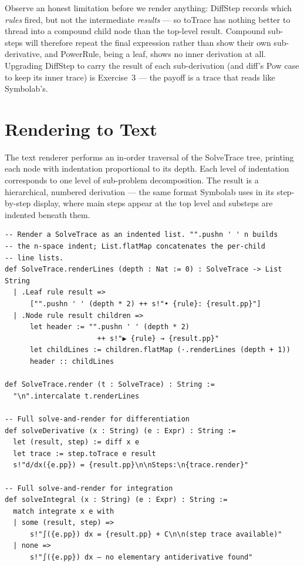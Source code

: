 \documentclass[12pt, openany]{book}
\theoremstyle{plain}
\theoremstyle{definition}
\theoremstyle{remark}
\newcommand{\li}[1]{{\ttfamily\small\color{tealaccent}#1}}
\begin{document}
Observe an honest limitation before we render anything: \li{DiffStep} records which \emph{rules} fired, but not the intermediate \emph{results} --- so \li{toTrace} has nothing better to thread into a compound child node than the top-level \li{result}.  Compound sub-steps will therefore repeat the final expression rather than show their own sub-derivative, and \li{PowerRule}, being a leaf, shows no inner derivation at all.  Upgrading \li{DiffStep} to carry the result of each sub-derivation (and \li{diff}'s \li{Pow} case to keep its inner trace) is Exercise~3 --- the payoff is a trace that reads like Symbolab's.

\section{Rendering to Text}

The text renderer performs an in-order traversal of the \li{SolveTrace} tree, printing each node with indentation proportional to its depth.  Each level of indentation corresponds to one level of sub-problem decomposition.  The result is a hierarchical, numbered derivation --- the same format Symbolab uses in its step-by-step display, where main steps appear at the top level and substeps are indented beneath them.

\begin{leanbox}
\begin{lstlisting}
-- Render a SolveTrace as an indented list. "".pushn ' ' n builds
-- the n-space indent; List.flatMap concatenates the per-child
-- line lists.
def SolveTrace.renderLines (depth : Nat := 0) : SolveTrace -> List String
  | .Leaf rule result =>
      ["".pushn ' ' (depth * 2) ++ s!"• {rule}: {result.pp}"]
  | .Node rule result children =>
      let header := "".pushn ' ' (depth * 2)
                      ++ s!"▶ {rule} → {result.pp}"
      let childLines := children.flatMap (·.renderLines (depth + 1))
      header :: childLines

def SolveTrace.render (t : SolveTrace) : String :=
  "\n".intercalate t.renderLines

-- Full solve-and-render for differentiation
def solveDerivative (x : String) (e : Expr) : String :=
  let (result, step) := diff x e
  let trace := step.toTrace e result
  s!"d/dx({e.pp}) = {result.pp}\n\nSteps:\n{trace.render}"

-- Full solve-and-render for integration
def solveIntegral (x : String) (e : Expr) : String :=
  match integrate x e with
  | some (result, step) =>
      s!"∫({e.pp}) dx = {result.pp} + C\n\n(step trace available)"
  | none =>
      s!"∫({e.pp}) dx — no elementary antiderivative found"
\end{lstlisting}
\end{leanbox}
\color{black}
\end{document}
